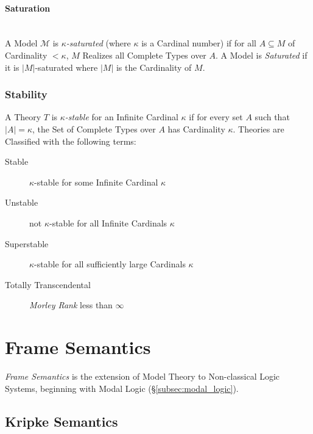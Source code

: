 \documentclass{article}
\begin{document}
\paragraph{Saturation}\label{subsec:model_saturation}\hfill
\\

A Model $\mathcal{M}$ is \emph{$\kappa$-saturated} (where $\kappa$ is
a Cardinal number) if for all $A \subseteq M$ of Cardinality $<
\kappa$, $M$ Realizes all Complete Types over $A$. A Model is
\emph{Saturated} if it is $|M|$-saturated where $|M|$ is the
Cardinality of $M$.

\subsubsection{Stability}\label{subsec:model_stability}

A Theory $T$ is \emph{$\kappa$-stable} for an Infinite Cardinal $\kappa$
if for every set $A$ such that $|A| = \kappa$, the Set of Complete
Types over $A$ has Cardinality $\kappa$. Theories are Classified with
the following terms:
\begin{description}
\item [Stable] $\kappa$-stable for some Infinite Cardinal $\kappa$
\item [Unstable] not $\kappa$-stable for all Infinite Cardinals $\kappa$
\item [Superstable] $\kappa$-stable for all sufficiently large
  Cardinals $\kappa$
\item [Totally Transcendental] \emph{Morley Rank}\cite{morley65} less
  than $\infty$
\end{description}

\section{Frame Semantics}\label{sec:frame_semantics}

\emph{Frame Semantics} is the extension of Model Theory to
Non-classical Logic Systems, beginning with Modal Logic
(\S\ref{subsec:modal_logic}).

\subsection{Kripke Semantics}\label{subsec:kripke_semantics}
\end{document}
